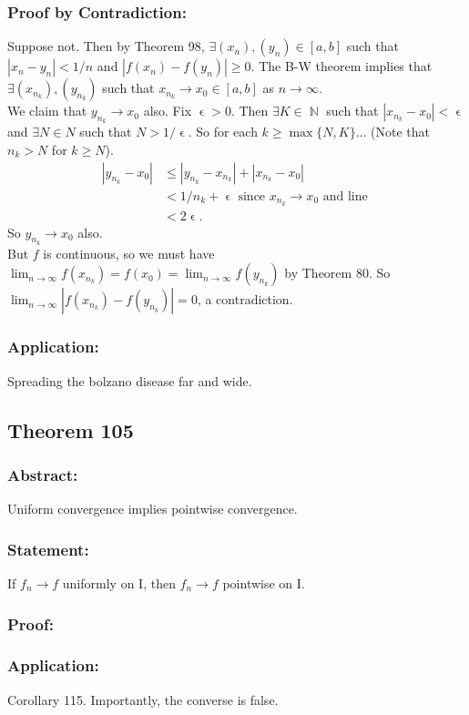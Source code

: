 \documentclass{article}
\DeclareMathOperator\eps{\epsilon}
\DeclareMathOperator\N{\mathbb{N}}
\begin{document}
\subsubsection*{Proof by Contradiction:}
Suppose not. Then by Theorem 98, $\exists (x_n),(y_n) \in [a,b]$
such that $|x_n-y_n| < 1 \slash n$ and $|f(x_n)-f(y_n)| \geq 0$.
The B-W theorem implies that $\exists (x_{n_k}),(y_{n_k})$ such that
$x_{n_k} \to x_0 \in [a,b]$ as $n \to \infty$. \\
\newline
We claim that
$y_{n_k} \to x_0$ also. Fix $\eps>0$. Then $\exists K \in \N$
such that $|x_{n_k}-x_0|< \eps$ and $\exists N \in N$ such that $N > 1 \slash \eps$. So for each $k \geq \max \{N,K\}$...
(Note that $n_k>N$ for $k \geq N$).
\begin{align*}
|y_{n_k}-x_0| &\leq |y_{n_k}-x_{n_k}| + |x_{n_k}-x_0| \\
&< 1 \slash n_k + \eps \text{ since $x_{n_k} \to x_0$ and line } \\
&< 2 \eps.
\end{align*}
So $y_{n_k} \to x_0$ also.
\\
\newline
But $f$ is continuous, so we must have
$\lim_{n \to \infty} f(x_{n_k}) = f(x_0) = \lim_{n \to \infty} f(y_{n_k})$ by Theorem 80.
So $\lim_{n \to \infty}|f(x_{n_k})-f(y_{n_k})| = 0$, a contradiction.
\subsubsection*{Application:}
Spreading the bolzano disease far and wide.
\subsection{Theorem 105}
\subsubsection*{Abstract:}
Uniform convergence implies pointwise convergence.
\subsubsection*{Statement:}
If $f_n \to f$ uniformly on I, then $f_n \to f$ pointwise on I.
\subsubsection*{Proof:}
\subsubsection*{Application:}
Corollary 115. Importantly, the converse is false.
\end{document}
